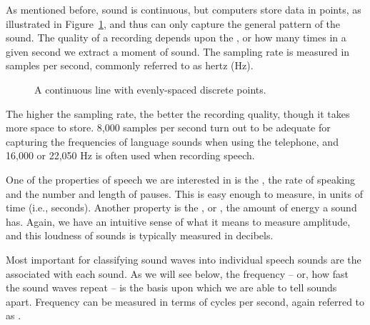As mentioned before, sound is continuous, but computers
store data in  points, as illustrated in
Figure~\ref{fig:continuous}, and thus can only capture the general
pattern of the sound.  The quality of a recording depends upon the
, or how many times in a given second we
extract a moment of sound.  The sampling rate is measured in samples
per second, commonly referred to as hertz (Hz).

\begin{figure}
\caption{A continuous line with evenly-spaced discrete points.}
\label{fig:continuous}
\end{figure}

The higher the sampling rate, the better the recording quality, though
it takes more space to store.
8,000 samples per second turn out to be
adequate for capturing the frequencies of language sounds when using
the telephone, and 16,000 or 22,050 Hz is often used when recording
speech.  

One of the properties of speech we are interested in is the
, the rate of speaking and the number and length
of pauses.  This is easy enough to measure, in units of time (i.e.,
seconds).  Another property is the , or , the
amount of energy a sound has.  Again, we have an intuitive sense of
what it means to measure amplitude, and this loudness of sounds is typically
measured in decibels.

Most important for classifying sound waves into individual speech
sounds are the  associated with each
sound.  As we will see below, the frequency -- or, how fast the sound
waves repeat -- is the basis upon which we are able to tell sounds
apart. Frequency can be measured in terms of cycles per second, again
referred to as .

